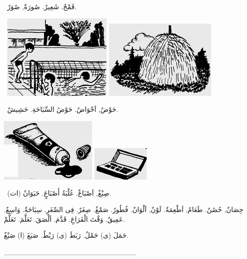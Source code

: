 \documentclass[a5paper]{article}
\begin{document}
\ قَمْحٌ. شَعِيرٌ. صُورَةٌ, صُوَرٌ.

\  \includegraphics[width=2.1354in,height=1.6665in]{images/MuhammadBagauddinprettified-img108.png}   \includegraphics[width=2.198in,height=1.552in]{images/MuhammadBagauddinprettified-img109.png} 

\ حَوْضٌ, اَحْوَاضٌ. حَوْضُ السِّبَاحَةِ. حَشِيشٌ. 

 \includegraphics[width=1.8957in,height=1.2602in]{images/MuhammadBagauddinprettified-img110.png}   \includegraphics[width=1.1252in,height=0.6772in]{images/MuhammadBagauddinprettified-img111.png} 

\ صِبْغٌ, اَصْبَاغٌ. عُلْبَةُ أَصْبَاغٍ. حَيَوَانٌ (ات). 

حِصَانٌ, حُصُنٌ. طَعَامٌ, اَطْعِمَةٌ. لَوْنٌ, اَلْوَانٌ. فُطُورٌ. صَمْغٌ. صِغَرٌ. فِى الصِّغَرِ. سِبَاحَةٌ. وَاسِعٌ. عَمِيقٌ. وَقْتَ الْفَرَاغِ. قَدَّمَ. اَلْصَقَ. تَعَلَّمَ. تَعَلَّمْ. 

حَمَلَ (ى) حَمْلٌ. رَبَطَ (ى) رَبْطٌ. صَبَغَ (ا) صَبْغٌ.

\_\_\_\_\_\_\_\_\_\_\_\_\_\_\_\_\_\_\_\_\_\_\_\_\_\_
\end{document}
